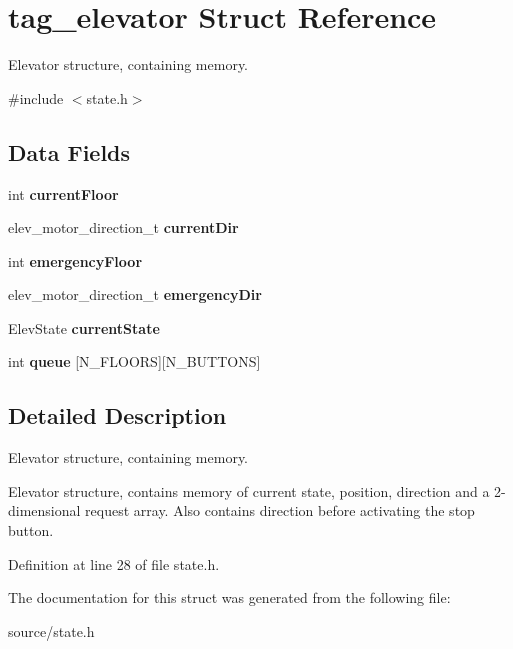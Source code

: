 \hypertarget{structtag__elevator}{}\section{tag\+\_\+elevator Struct Reference}
\label{structtag__elevator}


Elevator structure, containing memory.  




{\ttfamily \#include $<$state.\+h$>$}

\subsection*{Data Fields}
\begin{DoxyCompactItemize}
\item 
\mbox{\label{structtag__elevator_ab8d079cd5c67b9cab2084739e23e5767}} 
int {\bfseries current\+Floor}
\item 
\mbox{\label{structtag__elevator_afdd3e36be7cd9360b6b186fdb3715e64}} 
elev\+\_\+motor\+\_\+direction\+\_\+t {\bfseries current\+Dir}
\item 
\mbox{\label{structtag__elevator_ad0ba62d2cd31bb00fa02b8b2992172e0}} 
int {\bfseries emergency\+Floor}
\item 
\mbox{\label{structtag__elevator_ae9003095526b845b145f7db9cd95c9dd}} 
elev\+\_\+motor\+\_\+direction\+\_\+t {\bfseries emergency\+Dir}
\item 
\mbox{\label{structtag__elevator_afc2a79cf490fa3b52c52c309da4b61b6}} 
Elev\+State {\bfseries current\+State}
\item 
\mbox{\label{structtag__elevator_a1a603fb3c13454fc97598b347944d6c0}} 
int {\bfseries queue} \mbox{[}N\+\_\+\+F\+L\+O\+O\+RS\mbox{]}\mbox{[}N\+\_\+\+B\+U\+T\+T\+O\+NS\mbox{]}
\end{DoxyCompactItemize}


\subsection{Detailed Description}
Elevator structure, containing memory. 

Elevator structure, contains memory of current state, position, direction and a 2-\/dimensional request array. Also contains direction before activating the stop button. 

Definition at line 28 of file state.\+h.



The documentation for this struct was generated from the following file\+:\begin{DoxyCompactItemize}
\item 
source/state.\+h\end{DoxyCompactItemize}
